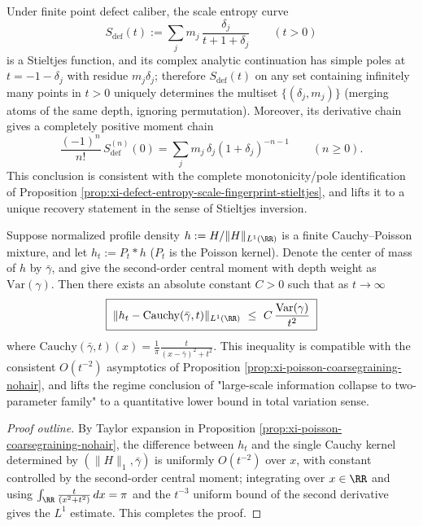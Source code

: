 \begin{corollary}\label{cor:dephys-stieltjes-inversion-scale-entropy}
Under finite point defect caliber, the scale entropy curve
\[
S_{\mathrm{def}}(t):=\sum_j m_j\,\frac{\delta_j}{t+1+\delta_j}\qquad(t>0)
\]
is a Stieltjes function, and its complex analytic continuation has simple poles at \(t=-1-\delta_j\) with residue \(m_j\delta_j\);
therefore \(S_{\mathrm{def}}(t)\) on any set containing infinitely many points in \(t>0\) uniquely determines the multiset \(\{(\delta_j,m_j)\}\) (merging atoms of the same depth, ignoring permutation).
Moreover, its derivative chain gives a completely positive moment chain
\[
\boxed{\;
\frac{(-1)^n}{n!}\,S_{\mathrm{def}}^{(n)}(0)
=\sum_j m_j\,\delta_j(1+\delta_j)^{-n-1}\qquad(n\ge 0).\;}
\]
This conclusion is consistent with the complete monotonicity/pole identification of Proposition \ref{prop:xi-defect-entropy-scale-fingerprint-stieltjes}, and lifts it to a unique recovery statement in the sense of Stieltjes inversion.
\end{corollary}

\begin{corollary}\label{cor:dephys-poisson-tv-bound-variance}
Suppose normalized profile density \(h:=H/\|H\|_{L^1(\RR)}\) is a finite Cauchy--Poisson mixture, and let \(h_t:=P_t*h\) (\(P_t\) is the Poisson kernel).
Denote the center of mass of \(h\) by \(\bar\gamma\), and give the second-order central moment with depth weight as
\(
\mathrm{Var}(\gamma)
\).
Then there exists an absolute constant \(C>0\) such that as \(t\to\infty\)
\[
\boxed{\;
\|h_t-\mathrm{Cauchy}(\bar\gamma,t)\|_{L^1(\RR)}
\ \le\ C\,\frac{\mathrm{Var}(\gamma)}{t^2}\;}
\]
where \(\mathrm{Cauchy}(\bar\gamma,t)(x)=\frac{1}{\pi}\frac{t}{(x-\bar\gamma)^2+t^2}\).
This inequality is compatible with the consistent \(O(t^{-2})\) asymptotics of Proposition \ref{prop:xi-poisson-coarsegraining-nohair}, and lifts the regime conclusion of "large-scale information collapse to two-parameter family" to a quantitative lower bound in total variation sense.
\end{corollary}

\begin{proof}[Proof outline]
By Taylor expansion in Proposition \ref{prop:xi-poisson-coarsegraining-nohair}, the difference between \(h_t\) and the single Cauchy kernel determined by \((\|H\|_1,\bar\gamma)\) is uniformly \(O(t^{-2})\) over \(x\), with constant controlled by the second-order central moment;
integrating over \(x\in\RR\) and using \(\int_{\RR}\frac{t}{(x^2+t^2)}\,dx=\pi\) and the \(t^{-3}\) uniform bound of the second derivative gives the \(L^1\) estimate. This completes the proof.
\end{proof}

